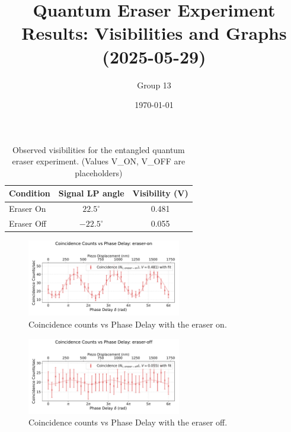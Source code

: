 \documentclass{article}
\title{Quantum Eraser Experiment Results: Visibilities and Graphs (2025-05-29)}
\author{Group 13} %
\date{\today}
\begin{document}
\pagestyle{empty} %

\begin{table}[h!]
\centering
\begin{tabular}{lcc}
\toprule
\textbf{Condition} & \textbf{Signal LP angle} & \textbf{Visibility (V)} \\
\midrule
Eraser On          & $22.5^\circ$  & 0.481 \\
Eraser Off         & $-22.5^\circ$ & 0.055 \\
\bottomrule
\end{tabular}
\caption{Observed visibilities for the entangled quantum eraser experiment. (Values V\_ON, V\_OFF are placeholders)}
\end{table}


\begin{figure}[h!]
\centering
\includegraphics[width=0.6\textwidth]{coincidence_counts_eraser_on.pdf}
\caption{Coincidence counts vs Phase Delay with the eraser on.}
\end{figure}


\begin{figure}[h!]
\centering
\includegraphics[width=0.6\textwidth]{coincidence_counts_eraser_off.pdf}
\caption{Coincidence counts vs Phase Delay with the eraser off.}
\end{figure}
\end{document}
